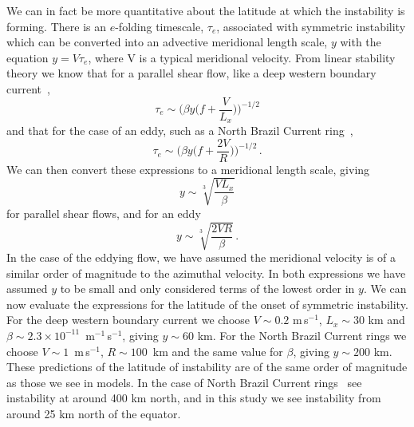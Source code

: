 We can in fact be more quantitative about the latitude at which the instability is forming. There is an $e$-folding timescale, $\tau_e$, associated with symmetric instability which can be converted into an advective meridional length scale, $y$ with the equation $y = V \tau_e$, where V is a typical meridional velocity. From linear stability theory we know that for a parallel shear flow, like a deep western boundary current~\cite{Hoskins1974},
\begin{equation}
    \tau_e \sim \Bigg(\beta y \bigg(f + \frac{V}{L_x}\bigg) \Bigg)^{-1/2}
\end{equation}
and that for the case of an eddy, such as a North Brazil Current ring~\cite{Buckingham2021},
\begin{equation}
    \tau_e \sim \Bigg(\beta y \bigg(f + \frac{2 V}{R}\bigg) \Bigg)^{-1/2} \, .
\end{equation}
We can then convert these expressions to a meridional length scale, giving
\begin{equation}
    y \sim \sqrt[3]{\frac{V L_x}{\beta}}
    \label{eq:dwbc_y}
\end{equation}
for parallel shear flows, and for an eddy
\begin{equation}
    y \sim \sqrt[3]{\frac{2 V R}{\beta}} \, .
    \label{eq:nbc_y}
\end{equation}
In the case of the eddying flow, we have assumed the meridional velocity is of a similar order of magnitude to the azimuthal velocity. In both expressions we have assumed $y$ to be small and only considered terms of the lowest order in $y$. We can now evaluate the expressions for the latitude of the onset of symmetric instability. For the deep western boundary current we choose $V \sim 0.2$ m\,s$^{-1}$, $L_x \sim 30$ km and $\beta \sim 2.3 \times 10^{-11}$~m$^{-1}$\,s$^{-1}$, giving $y \sim 60$ km. For the North Brazil Current rings we choose $V \sim 1$~m\,s$^{-1}$, $R \sim 100$~km and the same value for $\beta$, giving $y \sim 200$ km. These predictions of the latitude of instability are of the same order of magnitude as those we see in models. In the case of North Brazil Current rings~\citet{Goldsworth2021a} see instability at around 400 km north, and in this study we see instability from around 25 km north of the equator.

